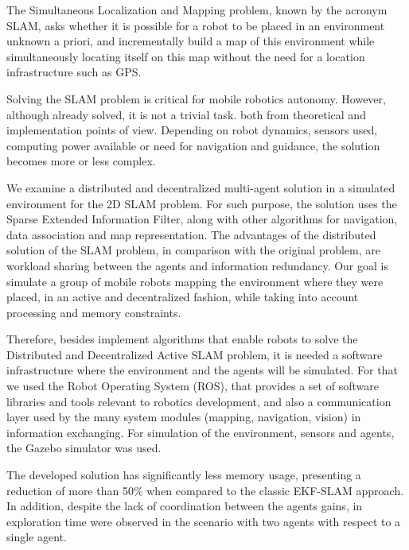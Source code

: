 The Simultaneous Localization and Mapping problem, known by the acronym SLAM, asks whether it is possible for a robot to be placed in an environment
unknown a priori, and incrementally build a map of this
environment while simultaneously locating itself on this map without the
need for a location infrastructure such as GPS.

Solving the SLAM problem is critical for mobile robotics
autonomy. However, although already solved, it is not a trivial task.
both from theoretical and implementation points of view.
Depending on robot dynamics, sensors used, computing power available or need for navigation and guidance, the solution
becomes more or less complex.

We examine a distributed and decentralized multi-agent solution in a simulated environment
for the 2D SLAM problem. For such purpose, the solution uses the Sparse Extended Information Filter, along with other algorithms for navigation,
data association and map representation. The advantages of the distributed solution of the
SLAM problem, in comparison with the original problem, are workload sharing
between the agents and information redundancy. Our goal is simulate a 
group of mobile robots mapping the environment where they were placed, 
in an active and decentralized fashion, while taking into account 
processing and memory constraints.

Therefore, besides implement algorithms that enable robots to solve the 
Distributed and Decentralized Active SLAM problem, it is needed a 
software infrastructure where the environment and the agents will be 
simulated. For that we used the Robot Operating System (ROS), that 
provides a set of software libraries and tools relevant to robotics 
development, and also a communication layer used by the many system 
modules (mapping, navigation, vision) in information exchanging. For 
simulation of the environment, sensors and agents, the Gazebo simulator 
was used.

The developed solution has significantly less memory usage,
presenting a reduction of more than 50\% when compared to the classic EKF-SLAM approach.
In addition, despite the lack of coordination between the agents
gains, in exploration time were observed in the scenario with two agents with respect to a single agent.
